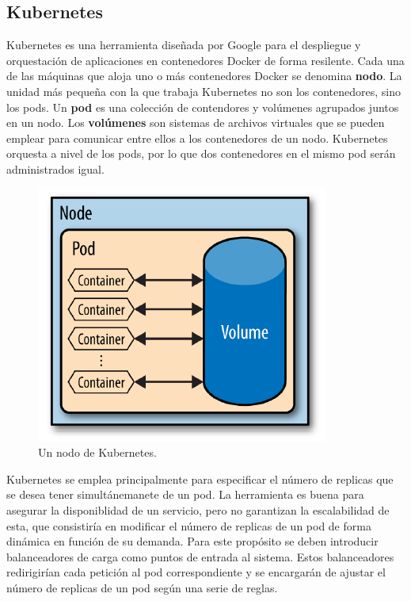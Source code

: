 \documentclass[11pt,spanish,listoffigures]{tfgetsinf}
\begin{document}
\subsection{Kubernetes}

Kubernetes es una herramienta diseñada por Google para el despliegue y orquestación de aplicaciones en contenedores Docker de forma resilente. Cada una de las máquinas que aloja uno o más contenedores Docker se denomina \textbf{nodo}. La unidad más pequeña con la que trabaja Kubernetes no son los contenedores, sino los pods. Un \textbf{pod} es una colección de contendores y volúmenes agrupados juntos en un nodo. Los \textbf{volúmenes} son sistemas de archivos virtuales que se pueden emplear para comunicar entre ellos a los contenedores de un nodo. Kubernetes orquesta a nivel de los pods, por lo que dos contenedores en el mismo pod serán administrados igual. \cite{Rensin2015}

\begin{figure}[h]
\centering
\includegraphics[scale=0.7]{kubernetes}
\caption{Un nodo de Kubernetes. \cite{Rensin2015}}
\end{figure}

Kubernetes se emplea principalmente para especificar el número de replicas que se desea tener simultánemanete de un pod. La herramienta es buena para asegurar la disponiblidad de un servicio, pero no garantizan la escalabilidad de esta, que consistiría en modificar el número de replicas de un pod de forma dinámica en función de su demanda. Para este propósito se deben introducir balanceadores de carga como puntos de entrada al sistema. Estos balanceadores redirigirían cada petición al pod correspondiente y se encargarán de ajustar el número de replicas de un pod según una serie de reglas.
\end{document}
